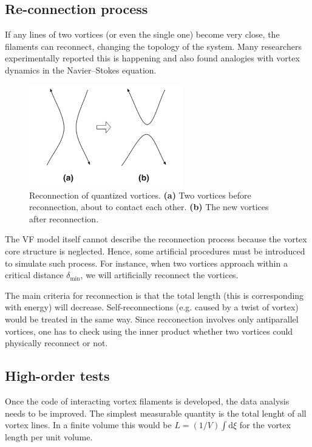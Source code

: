 \subsection*{Re-connection process}

If any lines of two vortices (or even the single one) become very close,
the filaments can reconnect, changing the topology of the system.
Many researchers experimentally reported this is happening and also found analogies with vortex dynamics in the Navier–Stokes equation.

\begin{figure}[h]
	\centering
	\includegraphics[width=0.6\textwidth]{graphics/simul/reconnection}
	\caption{Reconnection of quantized vortices. \textbf{(a)} Two vortices before reconnection, about to contact each other. \textbf{(b)} The new vortices after reconnection.}
\end{figure}

The VF model itself cannot describe the reconnection process because the vortex core structure is neglected. Hence, some artificial procedures must be introduced to simulate such process. For instance, when two vortices approach within a critical distance $\delta_{\text{min}}$, we will artificially reconnect the vortices.

The main criteria for reconnection is that the total length (this is corresponding with energy) will decrease. Self-reconnections (e.g. caused by a twist of vortex) would be treated in the same way. Since recconection involves only antiparallel vortices, one has to check using the inner product whether two vortices could physically reconnect or not.

\subsection*{High-order tests}

Once the code of interacting vortex filaments is developed, the data analysis needs to be improved. The simplest measurable quantity is the total lenght of all vortex lines. In a finite volume this would be $L = (1/V) \int \text{d}\xi$ for the vortex length per unit volume.

